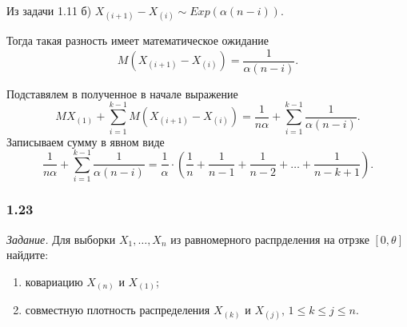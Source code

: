 Из задачи 1.11 б)
$X_{ \left( i + 1 \right) } - X_{ \left( i \right) } \sim
  Exp \left( \alpha \left( n - i \right) \right) $.

Тогда такая разность имеет математическое ожидание
$$M \left( X_{ \left( i + 1 \right) } - X_{ \left( i \right) } \right) =
  \frac{1}{ \alpha \left( n - i \right) }.$$

Подставялем в полученное в начале выражение
$$MX_{ \left( 1 \right) } +
  \sum \limits_{i = 1}^{k - 1}
    M \left( X_{ \left( i + 1 \right) } - X_{ \left(i \right) } \right) =
  \frac{1}{n \alpha } + \sum \limits_{i = 1}^{k - 1} \frac{1}{ \alpha \left( n - i \right) }.$$
Записываем сумму в явном виде
$$ \frac{1}{n \alpha } + \sum \limits_{i = 1}^{k - 1} \frac{1}{ \alpha \left( n - i \right) } =
  \frac{1}{ \alpha } \cdot
  \left( \frac{1}{n} + \frac{1}{n - 1} + \frac{1}{n - 2} + \dotsc + \frac{1}{n - k + 1} \right).$$

\subsubsection*{1.23}

\textit{Задание.}
Для выборки $X_1, \dotsc, X_n$ из равномерного распрделения на отрзке $ \left[ 0, \theta \right] $
найдите:
\begin{enumerate}[label=\alph*)]
  \item ковариацию $X_{ \left( n \right) }$ и $X_{ \left( 1 \right) }$;
  \item совместную плотность распределения
  $X_{ \left( k \right) }$ и $X_{ \left( j \right) }, \,
    1 \leq k \leq j \leq n$.
\end{enumerate}

